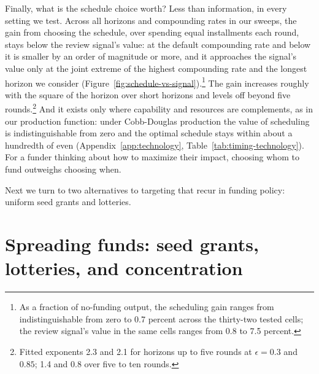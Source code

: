 \documentclass[article, 11pt, reqno]{amsart}
\theoremstyle{named}
\begin{document}
Finally, what is the schedule choice worth? Less than information, in every setting we test. Across all horizons and compounding rates in our sweeps, the gain from choosing the schedule, over spending equal installments each round, stays below the review signal's value: at the default compounding rate and below it is smaller by an order of magnitude or more, and it approaches the signal's value only at the joint extreme of the highest compounding rate and the longest horizon we consider (Figure~\ref{fig:schedule-vs-signal}).\footnote{As a fraction of no-funding output, the scheduling gain ranges from indistinguishable from zero to 0.7 percent across the thirty-two tested cells; the review signal's value in the same cells ranges from 0.8 to 7.5 percent.} The gain increases roughly with the square of the horizon over short horizons and levels off beyond five rounds.\footnote{Fitted exponents 2.3 and 2.1 for horizons up to five rounds at $\epsilon = 0.3$ and $0.85$; 1.4 and 0.8 over five to ten rounds.} And it exists only where capability and resources are complements, as in our production function: under Cobb-Douglas production the value of scheduling is indistinguishable from zero and the optimal schedule stays within about a hundredth of even (Appendix~\ref{app:technology}, Table~\ref{tab:timing-technology}). For a funder thinking about how to maximize their impact, choosing whom to fund outweighs choosing when.



Next we turn to two alternatives to targeting that recur in funding policy: uniform seed grants and lotteries.

\section{Spreading funds: seed grants, lotteries, and concentration}\label{sec:egalitarian}
\end{document}
